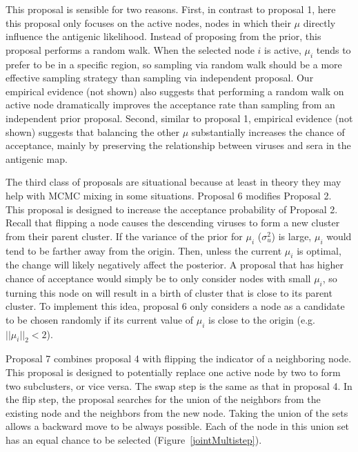 \documentclass[11pt,oneside,letterpaper]{article}
\begin{document}
This proposal is sensible for two reasons.
First, in contrast to proposal 1, here this proposal only focuses on the active nodes, nodes in which their $\mu$ directly influence the antigenic likelihood.
Instead of proposing from the prior, this proposal performs a random walk.
When the selected node $i$ is active, $\mu_i$ tends to prefer to be in a specific region, so sampling via random walk should be a more effective sampling strategy than sampling via independent proposal.
Our empirical evidence (not shown) also suggests that performing a random walk on active node dramatically improves the acceptance rate than sampling from an independent prior proposal.
Second, similar to proposal 1, empirical evidence (not shown) suggests that balancing the other $\mu$ substantially increases the chance of acceptance, mainly by preserving the relationship between viruses and sera in the antigenic map.


The third class of proposals are situational because at least in theory they may help with MCMC mixing in some situations.
Proposal 6 modifies Proposal 2. 
This proposal is designed to increase the acceptance probability of Proposal 2. 
Recall that flipping a node causes the descending viruses to form a new cluster from their parent cluster.
If the variance of the prior for $\mu_i$ ($\sigma^2_u$) is large, $\mu_i$ would tend to be farther away from the origin. 
Then, unless the current $\mu_i$ is optimal, the change will likely negatively affect the posterior.  
A proposal that has higher chance of acceptance would simply be to only consider nodes with small $\mu_i$, so turning this node on will result in a birth of cluster that is close to its parent cluster.
To implement this idea, proposal 6 only considers a node as a candidate to be chosen randomly if its current value of $\mu_i$ is close to the origin (e.g. $ || \mu_i ||_2  < 2$).


Proposal 7 combines proposal 4 with flipping the indicator of a neighboring node. 
This proposal is designed to potentially replace one active node by two to form two subclusters, or vice versa.
The swap step is the same as that in proposal 4.
In the flip step, the proposal searches for the union of the neighbors from the existing node and the neighbors from the new node.
Taking the union of the sets allows a backward move to be always possible.
Each of the node in this union set has an equal chance to be selected (Figure~\ref{jointMultistep}).
\end{document}
